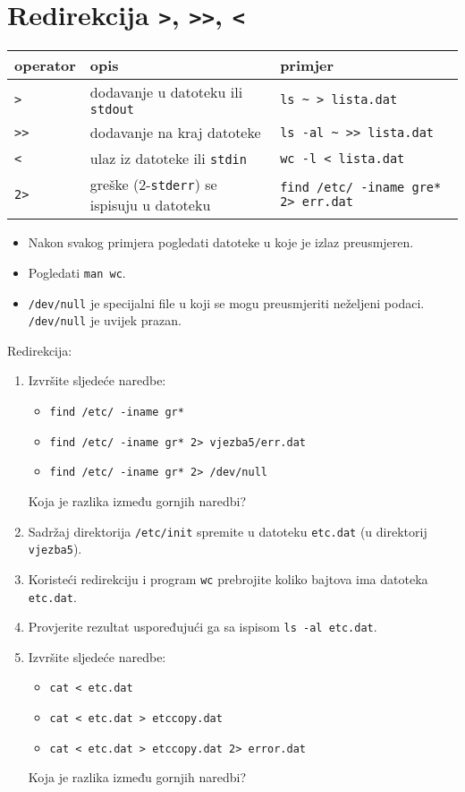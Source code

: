 \section{Redirekcija \lstinline!>!, \lstinline!>>!, \lstinline!<!}

\begin{tabularx}{\textwidth}{lXl}
\hline
operator & opis & primjer\\
\hline
\lstinline!>! & dodavanje u datoteku ili \texttt{stdout} &  \lstinline!ls ~ > lista.dat!\\
\lstinline!>>! & dodavanje na kraj datoteke & \lstinline!ls -al ~ >> lista.dat!\\
\lstinline!<! & ulaz iz datoteke ili \texttt{stdin} & \lstinline!wc -l < lista.dat!\\ 
\lstinline!2>! & greške (2-\texttt{stderr}) se ispisuju u datoteku & \lstinline!find /etc/ -iname gre* 2> err.dat!\\
\hline
\end{tabularx}

\begin{itemize}
 \item Nakon svakog primjera pogledati datoteke u koje je izlaz preusmjeren. 
 \item Pogledati \lstinline!man wc!.
 \item \lstinline!/dev/null! je specijalni file u koji se mogu preusmjeriti neželjeni podaci. \lstinline!/dev/null! je uvijek prazan.\\
\end{itemize}

\begin{zadatak} Redirekcija:
\begin{enumerate}
\item 
Izvršite sljedeće naredbe:
\begin{itemize}
 \item \lstinline!find /etc/ -iname gr*!
\item \lstinline!find /etc/ -iname gr* 2> vjezba5/err.dat!
\item \lstinline!find /etc/ -iname gr* 2> /dev/null!
\end{itemize}             
Koja je razlika između gornjih naredbi?
\item Sadržaj direktorija \lstinline!/etc/init! spremite u datoteku \lstinline!etc.dat! (u direktorij \lstinline!vjezba5!).
\item Koristeći redirekciju i program \lstinline!wc! prebrojite koliko bajtova ima datoteka \lstinline!etc.dat!.
\item Provjerite rezultat uspoređujući ga sa ispisom \lstinline!ls -al etc.dat!.
\item Izvršite sljedeće naredbe:
\begin{itemize}
 \item \lstinline!cat < etc.dat!
\item \lstinline!cat < etc.dat > etccopy.dat!
\item \lstinline!cat < etc.dat > etccopy.dat 2> error.dat!
\end{itemize}
Koja je razlika između gornjih naredbi?
\end{enumerate}
\end{zadatak}

